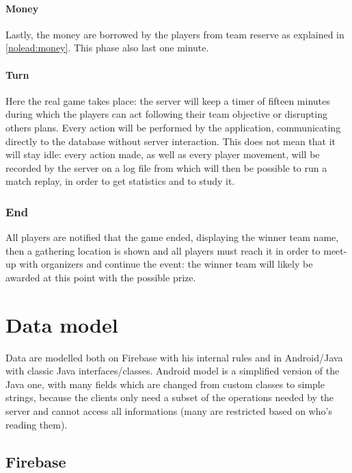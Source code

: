 			\paragraph{Money}
				
				Lastly, the money are borrowed by the players from team reserve as explained in \autoref{nolead:money}.
				This phase also last one minute.
							
			\paragraph{Turn}
			
				Here the real game takes place: the server will keep a timer of fifteen minutes during which the players can act following their team objective or disrupting others plans.
				Every action will be performed by the application, communicating directly to the database without server interaction. This does not mean that it will stay idle: every action made, as well as every player movement, will be recorded by the server on a log file from which will then be possible to run a match replay, in order to get statistics and to study it.
			
		\subsubsection{End}
		
			All players are notified that the game ended, displaying the winner team name, then a gathering location is shown and all players must reach it in order to meet-up with organizers and continue the event: the winner team will likely be awarded at this point with the possible prize.
			
	\section{Data model}	
		
		Data are modelled both on Firebase with his internal rules and in Android/Java with classic Java interfaces/classes.
		Android model is a simplified version of the Java one, with many fields which are changed from custom classes to simple strings, because the clients only need a subset of the operations needed by the server and cannot access all informations (many are restricted based on who's reading them).
		
		\subsection{Firebase}
			
